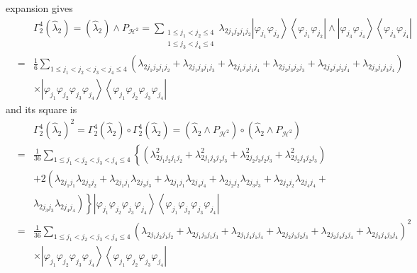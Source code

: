 \documentclass[12pt]{article}
\begin{document}
expansion gives 
\begin{eqnarray*}
&&\Gamma _{2}^{4}\left( \hat{\lambda}_{2}\right) =\left( \hat{\lambda}%
_{2}\right) \wedge P_{\mathcal{H}^{2}}=\sum_{\substack{ 1\leq
j_{1}<j_{2}\leq 4  \\ 1\leq j_{3}<j_{4}\leq 4}}\lambda
_{2j_{1}j_{2}j_{1}j_{2}}\left\vert \varphi _{j_{1}}\varphi
_{j_{2}}\right\rangle \left\langle \varphi _{j_{1}}\varphi
_{j_{2}}\right\vert \wedge \left\vert \varphi _{j_{3}}\varphi
_{j_{4}}\right\rangle \left\langle \varphi _{j_{3}}\varphi
_{j_{4}}\right\vert \\
&=&\frac{1}{6}\sum_{1\leq j_{1}<j_{2}<j_{3}<j_{4}\leq 4}\left( \lambda
_{2j_{1}j_{2}j_{1}j_{2}}+\lambda _{2j_{1}j_{3}j_{1}j_{3}}+\lambda
_{2j_{1}j_{4}j_{1}j_{4}}+\lambda _{2j_{2}j_{3}j_{2}j_{3}}+\lambda
_{2j_{2}j_{4}j_{2}j_{4}}+\lambda _{2j_{3}j_{4}j_{3}j_{4}}\right) \\
&&\times \left\vert \varphi _{j_{1}}\varphi _{j_{2}}\varphi _{j_{3}}\varphi
_{j_{4}}\right\rangle \left\langle \varphi _{j_{1}}\varphi _{j_{2}}\varphi
_{j_{3}}\varphi _{j_{4}}\right\vert
\end{eqnarray*}%
and its square is 
\begin{eqnarray*}
&&\Gamma _{2}^{4}\left( \hat{\lambda}_{2}\right) ^{2}=\Gamma _{2}^{4}\left( 
\hat{\lambda}_{2}\right) \circ \Gamma _{2}^{4}\left( \hat{\lambda}%
_{2}\right) =\left( \hat{\lambda}_{2}\wedge P_{\mathcal{H}^{2}}\right) \circ
\left( \hat{\lambda}_{2}\wedge P_{\mathcal{H}^{2}}\right) \\
&=&\frac{1}{36}\sum_{1\leq j_{1}<j_{2}<j_{3}<j_{4}\leq 4}\left\{ \left(
\lambda _{2j_{1}j_{2}j_{1}j_{2}}^{2}+\lambda
_{2j_{1}j_{3}j_{1}j_{3}}^{2}+\lambda _{2j_{2}j_{3}j_{2}j_{3}}^{2}+\lambda
_{2j_{2}j_{3}j_{2}j_{3}}^{2}\right) \right. \\
&&+2\left( \lambda _{2j_{1}j_{1}}\lambda _{2j_{2}j_{2}}+\lambda
_{2j_{1}j_{1}}\lambda _{2j_{3}j_{3}}+\lambda _{2j_{1}j_{1}}\lambda
_{2j_{4}j_{4}}+\lambda _{2j_{2}j_{2}}\lambda _{2j_{3}j_{3}}+\lambda
_{2j_{2}j_{2}}\lambda _{2j_{4}j_{4}}\right. + \\
&&\left. \left. \lambda _{2j_{3}j_{3}}\lambda _{2j_{4}j_{4}}\right) \right\}
\left\vert \varphi _{j_{1}}\varphi _{j_{2}}\varphi _{j_{3}}\varphi
_{j_{4}}\right\rangle \left\langle \varphi _{j_{1}}\varphi _{j_{2}}\varphi
_{j_{3}}\varphi _{j_{4}}\right\vert \\
&=&\frac{1}{36}\sum_{1\leq j_{1}<j_{2}<j_{3}<j_{4}\leq 4}\left( \lambda
_{2j_{1}j_{2}j_{1}j_{2}}+\lambda _{2j_{1}j_{3}j_{1}j_{3}}+\lambda
_{2j_{1}j_{4}j_{1}j_{4}}+\lambda _{2j_{2}j_{3}j_{2}j_{3}}+\lambda
_{2j_{2}j_{4}j_{2}j_{4}}+\lambda _{2j_{3}j_{4}j_{3}j_{4}}\right) ^{2} \\
&&\times \left\vert \varphi _{j_{1}}\varphi _{j_{2}}\varphi _{j_{3}}\varphi
_{j_{4}}\right\rangle \left\langle \varphi _{j_{1}}\varphi _{j_{2}}\varphi
_{j_{3}}\varphi _{j_{4}}\right\vert
\end{eqnarray*}%
\end{document}
